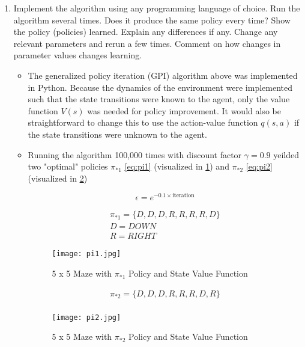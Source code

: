 \documentclass[letterpaper]{article} %
\begin{document}
\begin{enumerate}
    \item Implement the algorithm using any programming language of choice. Run the algorithm several times. Does it produce the same policy every time? Show the policy (policies) learned. Explain any differences if any. Change any relevant parameters and rerun a few times. Comment on how changes in parameter values changes learning.
	\begin{itemize}
	    \item The generalized policy iteration (GPI) algorithm above was implemented in Python. Because the dynamics of the environment were implemented such that the state transitions were known to the agent, only the value function $V(s)$ was needed for policy improvement. It would also be straightforward to change this to use the action-value function $q(s,a)$ if the state transitions were unknown to the agent.
	    \item Running the algorithm 100,000 times with discount factor $\gamma=0.9$ yeilded two "optimal" policies $\pi_{*1}$ \ref{eq:pi1} (visualized in \ref{fig:pi1}) and $\pi_{*2}$ \ref{eq:pi2} (visualized in \ref{fig:pi2})

	    \begin{equation}
		\label{eq:eps_decay}
		\epsilon = e^{-0.1 \times \text{iteration}}
	    \end{equation}

	    \begin{gather}
		\pi_{*1} = \{D,D,D,R,R,R,R,D\} \\
		D = DOWN \\
		R = RIGHT
	    \label{eq:pi1}
	    \end{gather}

	    \begin{figure}[htbp]
	      \centering
	      \texttt{[image: pi1.jpg]}
		\caption{5 x 5 Maze with $\pi_{*1}$ Policy and State Value Function}
	      \label{fig:pi1}
	    \end{figure}

	    \begin{gather}
		\pi_{*2} = \{D,D,D,R,R,R,D,R\} \\
	    \label{eq:pi2}
	    \end{gather}

	    \begin{figure}[htbp]
	      \centering
	      \texttt{[image: pi2.jpg]}
		\caption{5 x 5 Maze with $\pi_{*2}$ Policy and State Value Function}
	      \label{fig:pi2}
	    \end{figure}


\end{itemize}
\end{enumerate}
\end{document}
